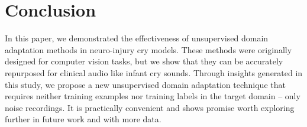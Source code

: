 \documentclass{article}
\begin{document}

\section{Conclusion}
In this paper, we demonstrated the effectiveness of unsupervised domain adaptation methods in neuro-injury cry models. These methods were originally designed for computer vision tasks, but we show that they can be accurately repurposed for clinical audio like infant cry sounds. Through insights generated in this study, we propose a new unsupervised domain adaptation technique that requires neither training examples nor training labels in the target domain -- only noise recordings. It is practically convenient and shows promise worth exploring further in future work and with more data.









\end{document}
